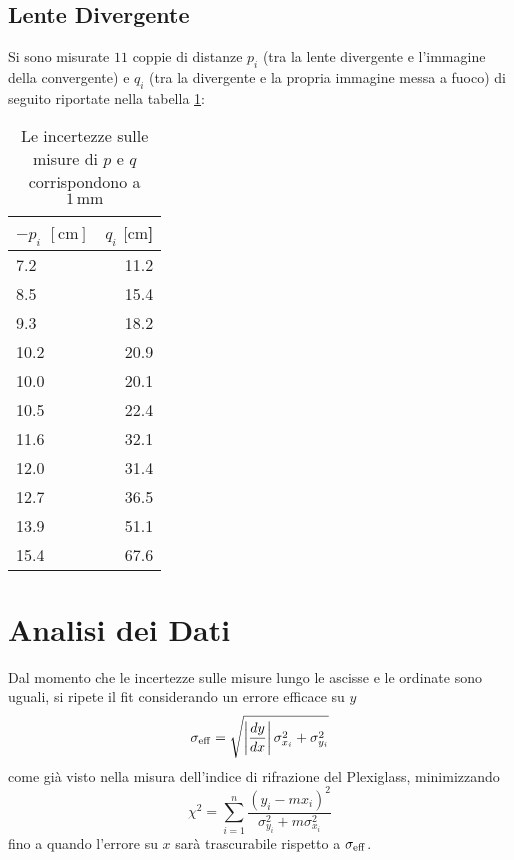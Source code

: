 \documentclass{article}[a4paper,11pt]
\begin{document}
\subsection*{Lente Divergente}
Si sono misurate $11$ coppie di distanze $p_i$ (tra la lente divergente e l'immagine della convergente) e $q_i$ (tra la divergente e la propria immagine messa a fuoco) di seguito riportate nella tabella \ref{tab:div20}:
\begin{table}[!htb]
  \begin{center}
	\begin{tabular}{lr}
	\toprule
	$-p_i$ $[\si{\cm}]$ & $q_i$ $[\si{\cm}$] \\
	\midrule
	\midrule
	7.2 & 11.2 \\
	8.5 & 15.4 \\
	9.3 & 18.2 \\
	10.2 & 20.9 \\
	10.0 & 20.1 \\
	10.5 & 22.4 \\
	11.6 & 32.1 \\
	12.0 & 31.4 \\
	12.7 & 36.5 \\
	13.9 & 51.1 \\
	15.4 & 67.6 \\
	\bottomrule
	\end{tabular}
  \end{center}
  \caption{Le incertezze sulle misure di $p$ e $q$ corrispondono a $1 \, \si{\mm}$ \label{tab:div20}}
\end{table}

\section{Analisi dei Dati}
Dal momento che le incertezze sulle misure lungo le ascisse e le ordinate sono uguali, si ripete il fit considerando un errore efficace su $y$ 
\begin{equation*}
\sigma_{\rm eff} = \sqrt{\left|\frac{dy}{dx}\right|\sigma_{x_i}^2 + \sigma_{y_i}^2}
\end{equation*}
come già visto nella misura dell'indice di rifrazione del Plexiglass, minimizzando 
\begin{equation}\label{eq:chi_eff}
\chi^2 = \sum_{i=1}^{n} \frac{(y_i-mx_i)^2}{\sigma_{y_i}^2 + m\sigma_{x_i}^2}
\end{equation}
fino a quando l'errore su $x$ sarà trascurabile rispetto a $\sigma_{\rm eff}$. 
\end{document}
